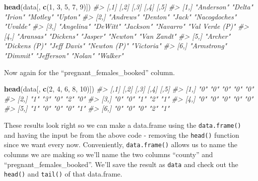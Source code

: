 \documentclass[
  12pt,
]{book}
\newenvironment{Shaded}{\begin{snugshade}}{\end{snugshade}}
\newcommand{\CommentTok}[1]{\textcolor[rgb]{0.56,0.35,0.01}{\textit{#1}}}
\newcommand{\DecValTok}[1]{\textcolor[rgb]{0.00,0.00,0.81}{#1}}
\newcommand{\KeywordTok}[1]{\textcolor[rgb]{0.13,0.29,0.53}{\textbf{#1}}}
\newcommand{\NormalTok}[1]{#1}
\begin{document}
\begin{Shaded}
\begin{Highlighting}[]
\KeywordTok{head}\NormalTok{(data[, }\KeywordTok{c}\NormalTok{(}\DecValTok{1}\NormalTok{, }\DecValTok{3}\NormalTok{, }\DecValTok{5}\NormalTok{, }\DecValTok{7}\NormalTok{, }\DecValTok{9}\NormalTok{)])}
\CommentTok{\#>      [,1]        [,2]          [,3]         [,4]          [,5]           }
\CommentTok{\#> [1,] "Anderson"  "Delta"       "Irion"      "Motley"      "Upton"        }
\CommentTok{\#> [2,] "Andrews"   "Denton"      "Jack"       "Nacogdoches" "Uvalde"       }
\CommentTok{\#> [3,] "Angelina"  "DeWitt"      "Jackson"    "Navarro"     "Val Verde (P)"}
\CommentTok{\#> [4,] "Aransas"   "Dickens"     "Jasper"     "Newton"      "Van Zandt"    }
\CommentTok{\#> [5,] "Archer"    "Dickens (P)" "Jeff Davis" "Newton (P)"  "Victoria"     }
\CommentTok{\#> [6,] "Armstrong" "Dimmit"      "Jefferson"  "Nolan"       "Walker"}
\end{Highlighting}
\end{Shaded}

Now again for the ``pregnant\_females\_booked'' column.

\begin{Shaded}
\begin{Highlighting}[]
\KeywordTok{head}\NormalTok{(data[, }\KeywordTok{c}\NormalTok{(}\DecValTok{2}\NormalTok{, }\DecValTok{4}\NormalTok{, }\DecValTok{6}\NormalTok{, }\DecValTok{8}\NormalTok{, }\DecValTok{10}\NormalTok{)])}
\CommentTok{\#>      [,1] [,2] [,3] [,4] [,5]}
\CommentTok{\#> [1,] "0"  "0"  "0"  "0"  "0" }
\CommentTok{\#> [2,] "1"  "3"  "0"  "2"  "0" }
\CommentTok{\#> [3,] "0"  "0"  "1"  "2"  "1" }
\CommentTok{\#> [4,] "0"  "0"  "0"  "0"  "0" }
\CommentTok{\#> [5,] "1"  "0"  "0"  "0"  "1" }
\CommentTok{\#> [6,] "0"  "0"  "0"  "2"  "1"}
\end{Highlighting}
\end{Shaded}

These results look right so we can make a data.frame using the \texttt{data.frame()} and having the input be from the above code - removing the \texttt{head()} function since we want every now. Conveniently, \texttt{data.frame()} allows us to name the columns we are making so we'll name the two columns ``county'' and ``pregnant\_females\_booked''. We'll save the result as \texttt{data} and check out the \texttt{head()} and \texttt{tail()} of that data.frame.
\end{document}

